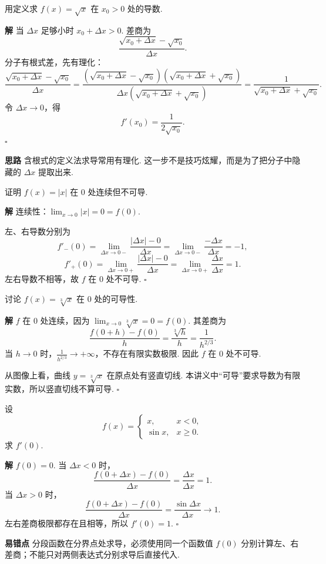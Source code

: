 \documentclass[fontset=fandol]{ctexart}
\newenvironment{solution}{\par\noindent\textbf{解}\quad}{\hfill$\square$\par\vspace{0.8em}}
\newenvironment{idea}{\par\noindent\textbf{思路}\quad}{\par\vspace{0.4em}}
\newenvironment{warning}{\par\noindent\textbf{易错点}\quad}{\par\vspace{0.8em}}
\begin{document}
\begin{example}[用定义求根式函数的导数]
用定义求 $f(x)=\sqrt{x}$ 在 $x_0>0$ 处的导数.
\end{example}
\begin{solution}
当 $\Delta x$ 足够小时 $x_0+\Delta x>0$. 差商为
\[
\frac{\sqrt{x_0+\Delta x}-\sqrt{x_0}}{\Delta x}.
\]
分子有根式差，先有理化：
\[
\frac{\sqrt{x_0+\Delta x}-\sqrt{x_0}}{\Delta x}
=\frac{(\sqrt{x_0+\Delta x}-\sqrt{x_0})(\sqrt{x_0+\Delta x}+\sqrt{x_0})}{\Delta x(\sqrt{x_0+\Delta x}+\sqrt{x_0})}
=\frac1{\sqrt{x_0+\Delta x}+\sqrt{x_0}}.
\]
令 $\Delta x\to0$，得
\[
f'(x_0)=\frac1{2\sqrt{x_0}}.
\]
\end{solution}
\begin{idea}
含根式的定义法求导常用有理化. 这一步不是技巧炫耀，而是为了把分子中隐藏的 $\Delta x$ 提取出来.
\end{idea}

\begin{example}[连续但不可导]
证明 $f(x)=|x|$ 在 $0$ 处连续但不可导.
\end{example}
\begin{solution}
连续性：$\lim_{x\to0}|x|=0=f(0)$.

左、右导数分别为
\[
f'_-(0)=\lim_{\Delta x\to0-}\frac{|\Delta x|-0}{\Delta x}
=\lim_{\Delta x\to0-}\frac{-\Delta x}{\Delta x}=-1,
\]
\[
f'_+(0)=\lim_{\Delta x\to0+}\frac{|\Delta x|-0}{\Delta x}
=\lim_{\Delta x\to0+}\frac{\Delta x}{\Delta x}=1.
\]
左右导数不相等，故 $f$ 在 $0$ 处不可导.
\end{solution}

\begin{example}[竖切线与有限导数]
讨论 $f(x)=\sqrt[3]{x}$ 在 $0$ 处的可导性.
\end{example}
\begin{solution}
$f$ 在 $0$ 处连续，因为 $\lim_{x\to0}\sqrt[3]{x}=0=f(0)$. 其差商为
\[
\frac{f(0+h)-f(0)}{h}=\frac{\sqrt[3]{h}}{h}=\frac1{h^{2/3}}.
\]
当 $h\to0$ 时，$\frac1{h^{2/3}}\to+\infty$，不存在有限实数极限. 因此 $f$ 在 $0$ 处不可导.

从图像上看，曲线 $y=\sqrt[3]{x}$ 在原点处有竖直切线. 本讲义中“可导”要求导数为有限实数，所以竖直切线不算可导.
\end{solution}

\begin{example}[分段函数在衔接点的导数]
设
\[
f(x)=
\begin{cases}
x,&x<0,\\
\sin x,&x\geq0.
\end{cases}
\]
求 $f'(0)$.
\end{example}
\begin{solution}
$f(0)=0$. 当 $\Delta x<0$ 时，
\[
\frac{f(0+\Delta x)-f(0)}{\Delta x}=\frac{\Delta x}{\Delta x}=1.
\]
当 $\Delta x>0$ 时，
\[
\frac{f(0+\Delta x)-f(0)}{\Delta x}=\frac{\sin\Delta x}{\Delta x}\to1.
\]
左右差商极限都存在且相等，所以 $f'(0)=1$.
\end{solution}
\begin{warning}
分段函数在分界点处求导，必须使用同一个函数值 $f(0)$ 分别计算左、右差商；不能只对两侧表达式分别求导后直接代入.
\end{warning}
\end{document}
